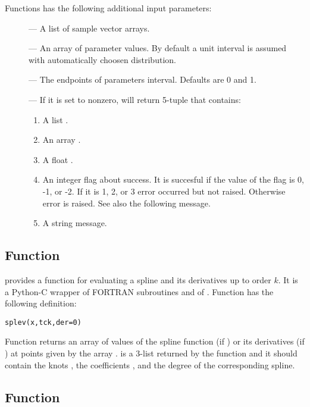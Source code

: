 Functions  has the following additional input
parameters:
\begin{description}
\item[] --- A list of sample vector arrays.
\item[] --- An array of parameter values. By default a unit
  interval is assumed with automatically choosen distribution.
\item[]  --- The endpoints of parameters interval. Defaults
  are 0 and 1.
\item[] --- If it is set to nonzero, 
  will return 5-tuple that contains:
  \begin{enumerate}
  \item A list .
  \item An array .
  \item A float .
  \item An integer flag about  success. It is succesful
    if the value of the flag is 0, -1, or -2. If it is 1, 2, or 3
    error occurred but not raised. Otherwise error is raised. See also
    the following message.
  \item A string message.
  \end{enumerate}
\end{description}

\subsection{Function }
\label{sec:splev}

 provides a function  for evaluating a
spline and its derivatives up to order $k$.
It is a Python-C wrapper of FORTRAN subroutines  and
 of .
Function  has the following definition:
\begin{verbatim}
splev(x,tck,der=0)
\end{verbatim}

Function  returns an array of values of the spline
function (if ) or its derivatives (if ) at
points given by the array .  is a 3-list returned by
the function  and it should contain the knots ,
the coefficients , and the degree  of the
corresponding spline.

\subsection{Function }
\label{sec:splint}

